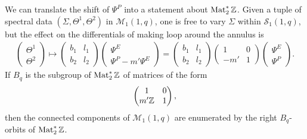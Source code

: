 \documentclass{article}
\begin{document}
We can translate the shift of $\Psi^P$ into a statement about $\operatorname{Mat}_2^*\mathbb{Z}$. Given a tuple of spectral data $(\Sigma,\Theta^1,\Theta^2)$ in $\mathcal{M}_1(1,q)$, one is free to vary $\Sigma$ within $\mathcal{S}_1(1,q)$, but the effect on the differentials of making loop around  the annulus is
\begin{align*}
\begin{pmatrix}
\Theta^1 \\ \Theta^2
\end{pmatrix}
\mapsto
\begin{pmatrix}
b_1 & l_1 \\
b_2 & l_2
\end{pmatrix}
\begin{pmatrix}
    \Psi^E \\ \Psi^P - m' \Psi^E
\end{pmatrix}
=
\begin{pmatrix}
b_1 & l_1 \\
b_2 & l_2
\end{pmatrix}
\begin{pmatrix}
    1 & 0 \\
    -m' & 1
\end{pmatrix}
\begin{pmatrix}
    \Psi^E \\ \Psi^P
    \end{pmatrix}.
\end{align*}
If $B_q$ is the subgroup of $\operatorname{Mat}_2^*\mathbb{Z}$ of matrices of the form
\[
\begin{pmatrix}
1 & 0 \\
m'\mathbb{Z} & 1
\end{pmatrix},
\]
then the connected components of $\mathcal{M}_1(1,q)$ are enumerated by the right $B_q$-orbits of $\operatorname{Mat}_2^*\mathbb{Z}$.
\end{document}
